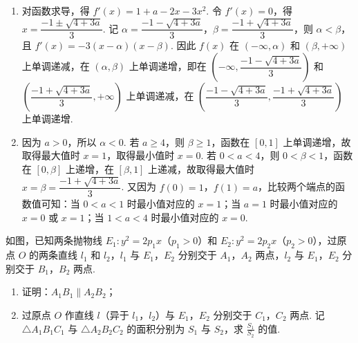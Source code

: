 \begin{solution}
\begin{enumerate}
\item 对函数求导，得 \(f'(x)=1+a-2x-3x^{2}\). 令 \(f'(x)=0\)，得 \(x=\dfrac{-1\pm\sqrt{4+3a}}{3}\). 记 \(\alpha=\dfrac{-1-\sqrt{4+3a}}{3}\)，\(\beta=\dfrac{-1+\sqrt{4+3a}}{3}\)，则 \(\alpha<\beta\)，且 \(f'(x)=-3(x-\alpha)(x-\beta)\). 因此 \(f(x)\) 在 \(\left(-\infty,\alpha\right)\) 和 \(\left(\beta,+\infty\right)\) 上单调递减，在 \(\left(\alpha,\beta\right)\) 上单调递增，即在 \(\left(-\infty,\dfrac{-1-\sqrt{4+3a}}{3}\right)\) 和 \(\left(\dfrac{-1+\sqrt{4+3a}}{3},+\infty\right)\) 上单调递减，在 \(\left(\dfrac{-1-\sqrt{4+3a}}{3},\dfrac{-1+\sqrt{4+3a}}{3}\right)\) 上单调递增.
\item 因为 \(a>0\)，所以 \(\alpha<0\). 若 \(a\geqslant4\)，则 \(\beta\geqslant1\)，函数在 \([0,1]\) 上单调递增，故取得最大值时 \(x=1\)，取得最小值时 \(x=0\). 若 \(0<a<4\)，则 \(0<\beta<1\)，函数在 \([0,\beta]\) 上递增，在 \([\beta,1]\) 上递减，故取得最大值时 \(x=\beta=\dfrac{-1+\sqrt{4+3a}}{3}\). 又因为 \(f(0)=1\)，\(f(1)=a\)，比较两个端点的函数值可知：当 \(0<a<1\) 时最小值对应的 \(x=1\)；当 \(a=1\) 时最小值对应的 \(x=0\) 或 \(x=1\)；当 \(1<a<4\) 时最小值对应的 \(x=0\).
\end{enumerate}
\end{solution}

\begin{problem}
如图，已知两条抛物线 \(E_{1}: y^{2} = 2p_{1}x\)（\(p_{1} > 0\)）和 \(E_{2}: y^{2} = 2p_{2}x\)（\(p_{2} > 0\)），过原点 \(O\) 的两条直线 \(l_{1}\) 和 \(l_{2}\)，\(l_{1}\) 与 \(E_{1}\)，\(E_{2}\) 分别交于 \(A_{1}\)，\(A_{2}\) 两点，\(l_{2}\) 与 \(E_{1}\)，\(E_{2}\) 分别交于 \(B_{1}\)，\(B_{2}\) 两点.

\begin{enumerate}
\item 证明：\(A_{1}B_{1} \parallel A_{2}B_{2}\)；
\item 过原点 \(O\) 作直线 \(l\)（异于 \(l_{1}\)，\(l_{2}\)）与 \(E_{1}\)，\(E_{2}\) 分别交于 \(C_{1}\)，\(C_{2}\) 两点. 记 \(\triangle A_{1}B_{1}C_{1}\) 与 \(\triangle A_{2}B_{2}C_{2}\) 的面积分别为 \(S_{1}\) 与 \(S_{2}\)，求 \(\frac{S_{1}}{S_{2}}\) 的值.
\end{enumerate}

\end{problem}

